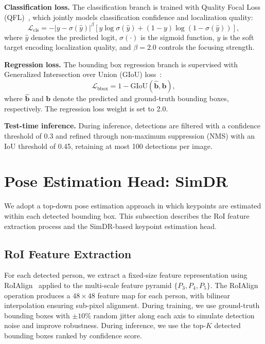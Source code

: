 \textbf{Classification loss.} The classification branch is trained with Quality Focal Loss (QFL)~\cite{li2020generalized}, which jointly models classification confidence and localization quality:
\begin{equation}
    \mathcal{L}_\text{cls} = -|y - \sigma(\hat{y})|^\beta \left[ y \log \sigma(\hat{y}) + (1-y) \log (1 - \sigma(\hat{y})) \right],
    \label{eq:qfl}
\end{equation}
where $\hat{y}$ denotes the predicted logit, $\sigma(\cdot)$ is the sigmoid function, $y$ is the soft target encoding localization quality, and $\beta = 2.0$ controls the focusing strength.

\textbf{Regression loss.} The bounding box regression branch is supervised with Generalized Intersection over Union (GIoU) loss~\cite{rezatofighi2019generalized}:
\begin{equation}
    \mathcal{L}_\text{bbox} = 1 - \text{GIoU}(\hat{\mathbf{b}}, \mathbf{b}),
    \label{eq:giou}
\end{equation}
where $\hat{\mathbf{b}}$ and $\mathbf{b}$ denote the predicted and ground-truth bounding boxes, respectively. The regression loss weight is set to 2.0.

\textbf{Test-time inference.} During inference, detections are filtered with a confidence threshold of 0.3 and refined through non-maximum suppression (NMS) with an IoU threshold of 0.45, retaining at most 100 detections per image.

\section{Pose Estimation Head: SimDR}
\label{sec:pose_head}

We adopt a top-down pose estimation approach in which keypoints are estimated within each detected bounding box. This subsection describes the RoI feature extraction process and the SimDR-based keypoint estimation head.

\subsection{RoI Feature Extraction}
\label{subsec:roi}

For each detected person, we extract a fixed-size feature representation using RoIAlign~\cite{he2017mask} applied to the multi-scale feature pyramid $\{P_3, P_4, P_5\}$. The RoIAlign operation produces a $48 \times 48$ feature map for each person, with bilinear interpolation ensuring sub-pixel alignment. During training, we use ground-truth bounding boxes with $\pm 10\%$ random jitter along each axis to simulate detection noise and improve robustness. During inference, we use the top-$K$ detected bounding boxes ranked by confidence score.

